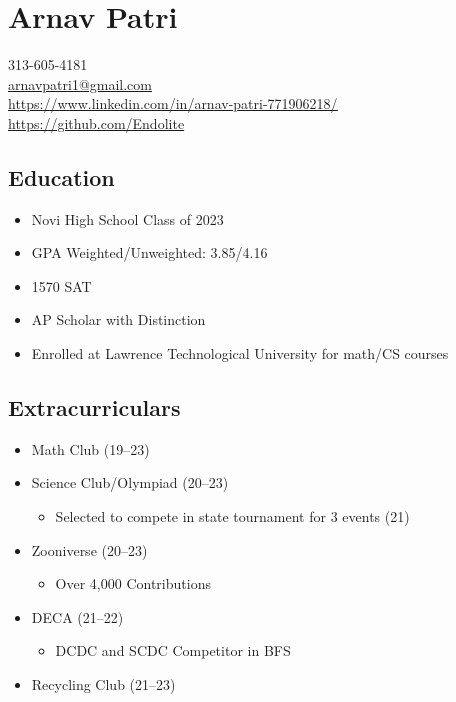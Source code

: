 \documentclass[12pt, twocolumn]{article}
\begin{document}
	{\parindent 0pt
		\section*{Arnav Patri}		
		\footnotesize
			313-605-4181 \\
			\href{mailto:arnavpatri1@gmail.com}{\underline{arnavpatri1@gmail.com}} \\
			\href{https://www.linkedin.com/in/arnav-patri-771906218/}{\underline{https://www.linkedin.com/in/arnav-patri-771906218/}}
			\href{https://github.com/Endolite}{\underline{https://github.com/Endolite}}
		\normalsize
			\subsection*{Education}
				\begin{itemize}
					\item
						Novi High School Class of 2023
					\item
						GPA Weighted/Unweighted: 3.85/4.16
					\item
						1570 SAT
					\item
						AP Scholar with Distinction
					\item
						Enrolled at Lawrence Technological University for math/CS courses
				\end{itemize}
			\subsection*{Extracurriculars}
				\begin{itemize}
					\item
						Math Club (19--23)
					\item
						Science Club/Olympiad (20--23)
						\begin{itemize}[leftmargin = 13.5pt]
							\item
								Selected to compete in state tournament for 3 events (21)
						\end{itemize}
					\item
						Zooniverse (20--23)
						\begin{itemize}[leftmargin = 13.5pt]
							\item
								Over 4,000 Contributions
						\end{itemize}
					\item
						DECA (21--22)
						\begin{itemize}[leftmargin = 13.5pt]
							\item
								DCDC and SCDC Competitor in BFS
						\end{itemize}
					\item
						Recycling Club (21--23)
				\end{itemize}
}
\end{document}
